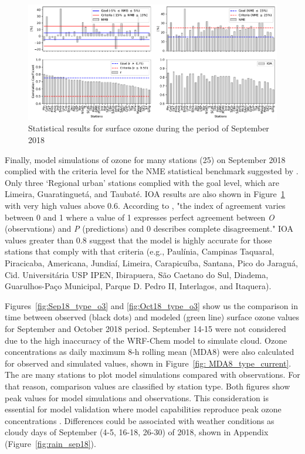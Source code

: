 \begin{figure}[!ht]
\begin{center}
    \includegraphics[width=1\textwidth]{fig/o3_stats.pdf}
\end{center}
  \caption{Statistical results for surface ozone during the period of September 2018}
  \label{fig: o3_stats}
\end{figure}

  Finally, model simulations of ozone for many stations (25) on September 2018 complied with the criteria level for the NME statistical benchmark suggested by \citet{Emery2017}. Only three `Regional urban' stations complied with the goal level, which are Limeira, Guaratinguet\'{a}, and Taubat\'{e}.
  IOA results are also shown in Figure~\ref{fig: o3_stats} with very high values above 0.6.
  According to \citet{Willmott1984}, "the index of agreement varies between 0 and 1 where a value of 1 expresses perfect agreement between \textit{O} (observations) and \textit{P} (predictions) and 0 describes complete disagreement."
  IOA values greater than 0.8 suggest that the model is highly accurate for those stations that comply with that criteria (e.g., Paul\'{i}nia,  Campinas Taquaral, Piracicaba, Americana, Jundia\'{i}, Limeira, Carapicu\'{i}ba, Santana, Pico do Jaragu\'{a}, Cid. Universit\'{a}ria USP IPEN, Ibirapuera, S\~{a}o Caetano do Sul, Diadema, Guarulhos-Pa\c{c}o Municipal, Parque D. Pedro II, Interlagos, and Itaquera).

Figures~\ref{fig:Sep18_type_o3} and \ref{fig:Oct18_type_o3} show us the comparison in time between observed (black dots) and modeled (green line) surface ozone values for September and October 2018 period.
September 14-15 were not considered due to the high inaccuracy of the WRF-Chem model to simulate cloud.   
Ozone concentrations as daily maximum 8-h rolling mean (MDA8) were also calculated for observed and simulated values, shown in Figure~\ref{fig: MDA8_type_current}.
The are many stations to plot model simulations compared with observations.
For that reason, comparison values are classified by station type.
Both figures show peak values for model simulations and observations.
This consideration is essential for model validation where model capabilities reproduce peak ozone concentrations \citep{Seinfeld2016}.
Differences could be associated with weather conditions as cloudy days of September (4-5, 16-18, 26-30) of 2018, shown in Appendix (Figure~\ref{fig:rain_sep18}).

